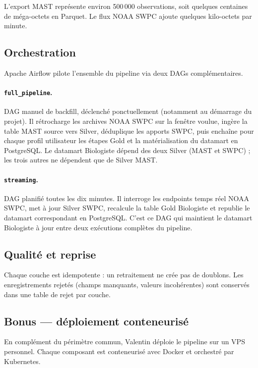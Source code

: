 \documentclass[11pt,a4paper]{article}
\begin{document}
L'export MAST représente environ 500\,000 observations, soit quelques centaines de méga-octets en Parquet. Le flux NOAA SWPC ajoute quelques kilo-octets par minute.

\subsection{Orchestration}

Apache Airflow pilote l'ensemble du pipeline via deux DAGs complémentaires.

\paragraph{\texttt{full\_pipeline}.} DAG manuel de backfill, déclenché ponctuellement (notamment au démarrage du projet). Il rétrocharge les archives NOAA SWPC sur la fenêtre voulue, ingère la table MAST source vers Silver, déduplique les apports SWPC, puis enchaîne pour chaque profil utilisateur les étapes Gold et la matérialisation du datamart en PostgreSQL. Le datamart Biologiste dépend des deux Silver (MAST et SWPC) ; les trois autres ne dépendent que de Silver MAST.

\paragraph{\texttt{streaming}.} DAG planifié toutes les dix minutes. Il interroge les endpoints temps réel NOAA SWPC, met à jour Silver SWPC, recalcule la table Gold Biologiste et republie le datamart correspondant en PostgreSQL. C'est ce DAG qui maintient le datamart Biologiste à jour entre deux exécutions complètes du pipeline.

\subsection{Qualité et reprise}

Chaque couche est idempotente : un retraitement ne crée pas de doublons. Les enregistrements rejetés (champs manquants, valeurs incohérentes) sont conservés dans une table de rejet par couche.

\subsection{Bonus --- déploiement conteneurisé}

En complément du périmètre commun, Valentin déploie le pipeline sur un VPS personnel. Chaque composant est conteneurisé avec Docker et orchestré par Kubernetes.
\end{document}
